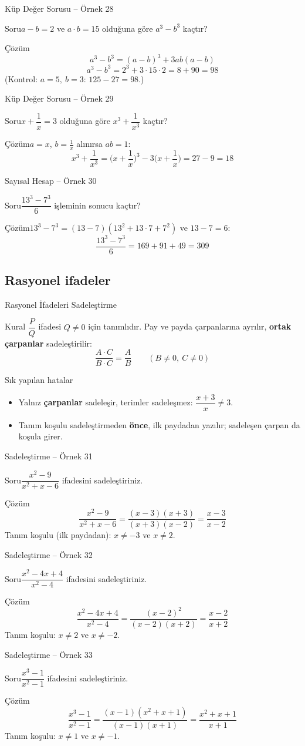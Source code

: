 \documentclass[aspectratio=169,11pt]{beamer}
\newcommand{\soru}[3]{%
\begin{frame}{#1}
  \begin{block}{Soru}\large #2\end{block}
  \pause
  \begin{exampleblock}{Çözüm}\large #3\end{exampleblock}
\end{frame}}
\begin{document}
\soru{Küp Değer Sorusu -- Örnek 28}
{\(a-b=2\) ve \(a\cdot b=15\) olduğuna göre \(a^3-b^3\) kaçtır?}
{\[a^3-b^3=(a-b)^3+3ab(a-b)\]
\[a^3-b^3=2^3+3\cdot 15\cdot 2=8+90=98\]
(Kontrol: \(a=5,\ b=3\): \(125-27=98\).)}

\soru{Küp Değer Sorusu -- Örnek 29}
{\(x+\dfrac{1}{x}=3\) olduğuna göre \(x^3+\dfrac{1}{x^3}\) kaçtır?}
{\(a=x\), \(b=\frac{1}{x}\) alınırsa \(ab=1\):
\[x^3+\frac{1}{x^3}=\Big(x+\frac{1}{x}\Big)^3-3\Big(x+\frac{1}{x}\Big)=27-9=18\]}

\soru{Sayısal Hesap -- Örnek 30}
{\(\dfrac{13^3-7^3}{6}\) işleminin sonucu kaçtır?}
{\(13^3-7^3=(13-7)(13^2+13\cdot 7+7^2)\) ve \(13-7=6\):
\[\frac{13^3-7^3}{6}=169+91+49=309\]}

\subsection{Rasyonel ifadeler}
\begin{frame}{Rasyonel İfadeleri Sadeleştirme}
\begin{block}{Kural}
\(\dfrac{P}{Q}\) ifadesi \(Q\neq 0\) için tanımlıdır. Pay ve payda çarpanlarına ayrılır, \textbf{ortak çarpanlar} sadeleştirilir:
\[\frac{A\cdot C}{B\cdot C}=\frac{A}{B}\qquad(B\neq 0,\ C\neq 0)\]
\end{block}
\begin{alertblock}{Sık yapılan hatalar}
\begin{itemize}
\item Yalnız \textbf{çarpanlar} sadeleşir, terimler sadeleşmez: \(\dfrac{x+3}{x}\neq 3\).
\item Tanım koşulu sadeleştirmeden \textbf{önce}, ilk paydadan yazılır; sadeleşen çarpan da koşula girer.
\end{itemize}
\end{alertblock}
\end{frame}

\soru{Sadeleştirme -- Örnek 31}
{\(\dfrac{x^2-9}{x^2+x-6}\) ifadesini sadeleştiriniz.}
{\[\frac{x^2-9}{x^2+x-6}=\frac{(x-3)(x+3)}{(x+3)(x-2)}=\frac{x-3}{x-2}\]
Tanım koşulu (ilk paydadan): \(x\neq -3\) ve \(x\neq 2\).}

\soru{Sadeleştirme -- Örnek 32}
{\(\dfrac{x^2-4x+4}{x^2-4}\) ifadesini sadeleştiriniz.}
{\[\frac{x^2-4x+4}{x^2-4}=\frac{(x-2)^2}{(x-2)(x+2)}=\frac{x-2}{x+2}\]
Tanım koşulu: \(x\neq 2\) ve \(x\neq -2\).}

\soru{Sadeleştirme -- Örnek 33}
{\(\dfrac{x^3-1}{x^2-1}\) ifadesini sadeleştiriniz.}
{\[\frac{x^3-1}{x^2-1}=\frac{(x-1)(x^2+x+1)}{(x-1)(x+1)}=\frac{x^2+x+1}{x+1}\]
Tanım koşulu: \(x\neq 1\) ve \(x\neq -1\).}
\end{document}

